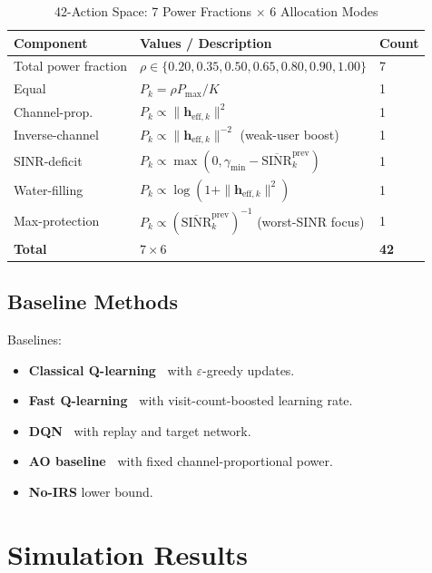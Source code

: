 \documentclass[journal,twocolumn]{IEEEtran}
\newcommand{\vect}[1]{\mathbf{#1}}
\begin{document}
\begin{table}[t]
\centering
\caption{42-Action Space: 7 Power Fractions $\times$ 6 Allocation Modes}
\label{tab:actions}
\setlength{\tabcolsep}{4pt}
\begin{tabular}{lll}
\toprule
\textbf{Component} & \textbf{Values / Description} & \textbf{Count} \\
\midrule
Total power fraction & $\rho \in \{0.20, 0.35, 0.50, 0.65, 0.80, 0.90, 1.00\}$ & 7 \\
\midrule
Equal & $P_k = \rho P_{\max}/K$ & 1 \\
Channel-prop. & $P_k \propto \|\vect{h}_{\text{eff},k}\|^2$ & 1 \\
Inverse-channel & $P_k \propto \|\vect{h}_{\text{eff},k}\|^{-2}$ (weak-user boost) & 1 \\
SINR-deficit & $P_k \propto \max(0, \gamma_{\min} - \overline{\text{SINR}}_k^{\text{prev}})$ & 1 \\
Water-filling & $P_k \propto \log(1 + \|\vect{h}_{\text{eff},k}\|^2)$ & 1 \\
Max-protection & $P_k \propto (\overline{\text{SINR}}_k^{\text{prev}})^{-1}$ (worst-SINR focus) & 1 \\
\midrule
\textbf{Total} & $7 \times 6$ & \textbf{42} \\
\bottomrule
\end{tabular}
\end{table}

\subsection{Baseline Methods}

Baselines:
\begin{itemize}
\item \textbf{Classical Q-learning~\cite{watkins1992q}} with $\varepsilon$-greedy updates.
\item \textbf{Fast Q-learning~\cite{yang2021irs}} with visit-count-boosted learning rate.
\item \textbf{DQN~\cite{mnih2015human}} with replay and target network.
\item \textbf{AO baseline~\cite{wu2019intelligent}} with fixed channel-proportional power.
\item \textbf{No-IRS} lower bound.
\end{itemize}

\section{Simulation Results}
\label{sec:results}
\end{document}
